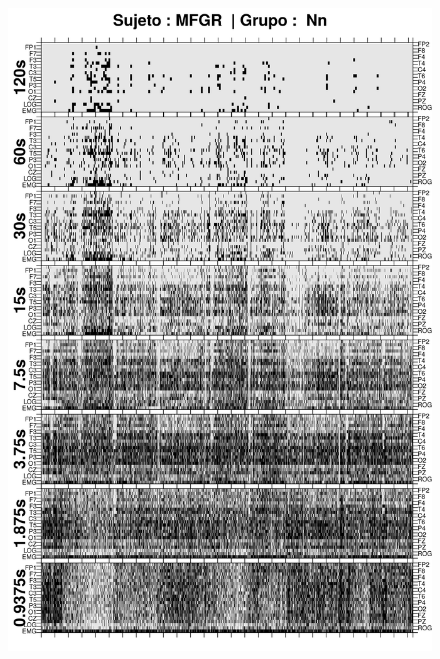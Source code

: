 \begin{figure}
\centering
\includegraphics[width=0.9\linewidth]
{./img_ejemplos/GURM251148SUE_comp_est_.png} 
\end{figure}


